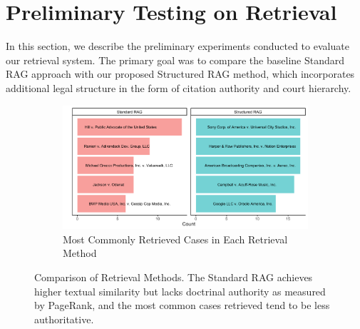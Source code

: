 \section{Preliminary Testing on Retrieval}

In this section, we describe the preliminary experiments conducted to evaluate our retrieval system. The primary goal was to compare the baseline Standard RAG approach with our proposed Structured RAG method, which incorporates additional legal structure in the form of citation authority and court hierarchy.

\begin{figure}[htbp]
  \centering
  \begin{subfigure}[b]{0.52\textwidth}
    \centering
    \includegraphics[width=\textwidth]{Top_Cases.png}
    \caption{Most Commonly Retrieved Cases in Each Retrieval Method}
    \label{fig:topcases}
  \end{subfigure}
  \hfill %
  \caption{Comparison of Retrieval Methods. The Standard RAG achieves higher textual similarity but lacks doctrinal authority as measured by PageRank, and the most common cases retrieved tend to be less authoritative.}
  \label{fig:combined}
\end{figure}



